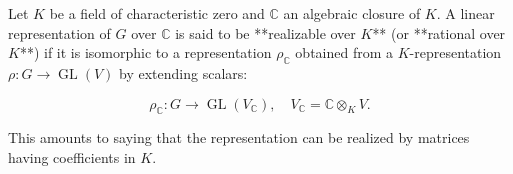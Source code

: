 Let $K$ be a field of characteristic zero and $\mathbb{C}$ an algebraic closure of $K$. A linear representation of $G$ over $\mathbb{C}$ is said to be **realizable over $K$** (or **rational over $K$**) if it is isomorphic to a representation $\rho_{\mathbb{C}}$ obtained from a $K$-representation $\rho: G \to \operatorname{GL}(V)$ by extending scalars:

$$\rho_{\mathbb{C}}: G \to \operatorname{GL}(V_{\mathbb{C}}), \quad V_{\mathbb{C}} = \mathbb{C} \otimes_K V.$$

This amounts to saying that the representation can be realized by matrices having coefficients in $K$.
